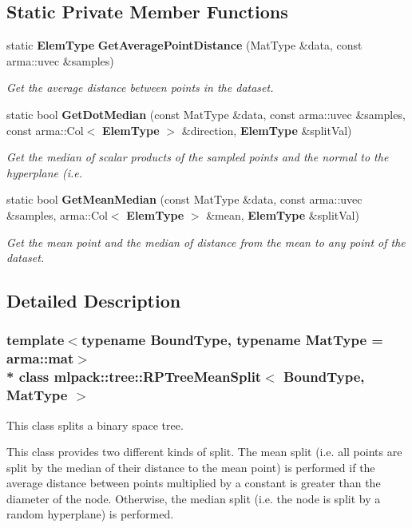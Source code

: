 \subsection*{Static Private Member Functions}
\begin{DoxyCompactItemize}
\item 
static {\bf Elem\+Type} {\bf Get\+Average\+Point\+Distance} (Mat\+Type \&data, const arma\+::uvec \&samples)
\begin{DoxyCompactList}\small\item\em Get the average distance between points in the dataset. \end{DoxyCompactList}\item 
static bool {\bf Get\+Dot\+Median} (const Mat\+Type \&data, const arma\+::uvec \&samples, const arma\+::\+Col$<$ {\bf Elem\+Type} $>$ \&direction, {\bf Elem\+Type} \&split\+Val)
\begin{DoxyCompactList}\small\item\em Get the median of scalar products of the sampled points and the normal to the hyperplane (i.\+e. \end{DoxyCompactList}\item 
static bool {\bf Get\+Mean\+Median} (const Mat\+Type \&data, const arma\+::uvec \&samples, arma\+::\+Col$<$ {\bf Elem\+Type} $>$ \&mean, {\bf Elem\+Type} \&split\+Val)
\begin{DoxyCompactList}\small\item\em Get the mean point and the median of distance from the mean to any point of the dataset. \end{DoxyCompactList}\end{DoxyCompactItemize}


\subsection{Detailed Description}
\subsubsection*{template$<$typename Bound\+Type, typename Mat\+Type = arma\+::mat$>$\\*
class mlpack\+::tree\+::\+R\+P\+Tree\+Mean\+Split$<$ Bound\+Type, Mat\+Type $>$}

This class splits a binary space tree. 

This class provides two different kinds of split. The mean split (i.\+e. all points are split by the median of their distance to the mean point) is performed if the average distance between points multiplied by a constant is greater than the diameter of the node. Otherwise, the median split (i.\+e. the node is split by a random hyperplane) is performed. 

